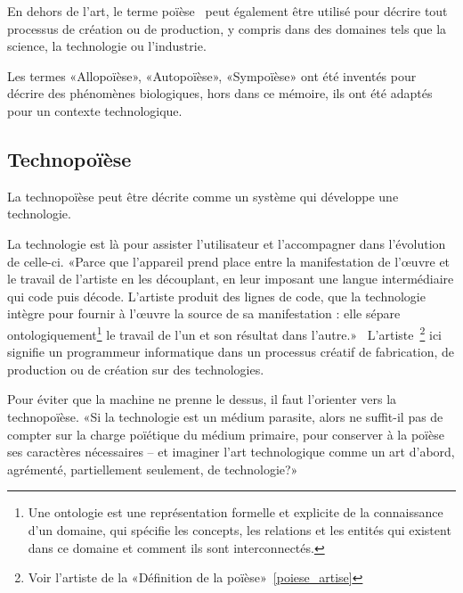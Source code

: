 En dehors de l'art, le terme poïèse~\cite{wikipedia_poiese_2022} peut également être utilisé pour décrire tout processus de création ou de production, y compris dans des domaines tels que la science, la technologie ou l'industrie.

Les termes «Allopoïèse», «Autopoïèse», «Sympoïèse» ont été inventés pour décrire des phénomènes biologiques, hors dans ce mémoire, ils ont été adaptés pour un contexte technologique.

\subsection{Technopoïèse}



La technopoïèse peut être décrite comme un système qui développe une technologie.

La technologie est là pour assister l'utilisateur et l'accompagner dans l'évolution de celle-ci. «Parce que l’appareil prend place entre la manifestation de l’œuvre et le travail de l’artiste en les découplant, en leur imposant une langue intermédiaire qui code puis décode. L’artiste produit des lignes de code, que la technologie intègre pour fournir à l’œuvre la source de sa manifestation : elle sépare ontologiquement\footnote{Une ontologie est une représentation formelle et explicite de la connaissance d'un domaine, qui spécifie les concepts, les relations et les entités qui existent dans ce domaine et comment ils sont interconnectés.} le travail de l’un et son résultat dans l’autre.»~\cite{artiste_techno_conf_2012} L'artiste~\footnote{Voir l'artiste de la «Définition de la poïèse»~\ref{poiese_artise}} ici signifie un programmeur informatique dans un processus créatif de fabrication, de production ou de création sur des technologies.

Pour éviter que la machine ne prenne le dessus, il faut l'orienter vers la technopoïèse. «Si la technologie est un médium parasite, alors ne suffit-il pas de compter sur la charge poïétique du médium primaire, pour conserver à la poïèse ses caractères nécessaires – et imaginer l’art technologique comme un art d’abord, agrémenté, partiellement seulement, de technologie?»~\cite{artiste_techno_conf_2012} %

